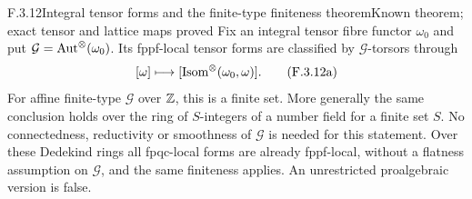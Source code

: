 \begin{result}{F.3.12}{Integral tensor forms and the finite-type finiteness theorem}{Known theorem; exact tensor and lattice maps proved}
Fix an integral tensor fibre functor $\omega_0$ and put
$\mathcal G=\operatorname{Aut}^\otimes(\omega_0)$. Its fppf-local tensor
forms are classified by $\mathcal G$-torsors through
\[
 [\omega]\longmapsto
       [\operatorname{Isom}^\otimes(\omega_0,\omega)].
 \tag{F.3.12a}
\]
For affine finite-type $\mathcal G$ over $\mathbb Z$, this is a finite
set. More generally the same conclusion holds over the ring
of $S$-integers of a number field for a finite set $S$.
No connectedness,
reductivity or smoothness of $\mathcal G$ is needed for this
statement. Over these Dedekind rings all fpqc-local forms
are already fppf-local, without a flatness assumption on
$\mathcal G$, and the same finiteness applies. An
unrestricted proalgebraic version is false.
\end{result}
